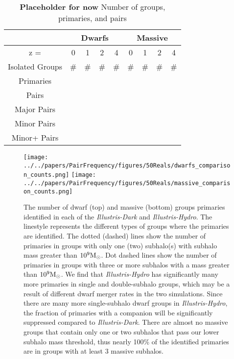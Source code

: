 \documentclass[twocolumn]{aastex63}
\newcommand{\kc}[1]{\textcolor{mypink}{\textbf{#1}} }
\begin{document}
\begin{table*}[htb]
  \begin{center}
\begin{tabular}{ccccc|cccc}
    & \multicolumn{4}{c}{Dwarfs} & \multicolumn{4}{c}{Massive} \\\hline\hline
    z = &0&1&2&4&0&1&2&4 \\ \hline
    Isolated Groups & \# & \# &\# &\#&\#&\#&\#&\#\\
Primaries &  & &&&&&& \\
Pairs &  & &&&&&& \\
Major Pairs &  & &&&&&& \\
Minor Pairs &  & &&&&&& \\
Minor+ Pairs &  & &&&&&& \\\hline
\end{tabular}
\end{center}
\caption{\label{table:counts}\kc{Placeholder for now} Number of groups, primaries, and pairs}
\end{table*}


\begin{figure}[htb]
    \centering
    \texttt{[image: ../../papers/PairFrequency/figures/50Reals/dwarfs\_comparison\_counts.png]}
    \texttt{[image: ../../papers/PairFrequency/figures/50Reals/massive\_comparison\_counts.png]}
    \caption{\label{fig:counts} The number of dwarf (top) and massive (bottom) groups primaries identified in each of the \textit{Illustris-Dark} and \textit{Illustris-Hydro}. The linestyle represents the different types of groups where the primaries are identified. The dotted (dashed) lines show the number of primaries in
    groups with only one (two) subhalo(s) with subhalo mass greater than $10^9 \rm M_\odot$. Dot dashed lines show the number of primaries in 
    groups with three or more subhalos with a mass greater than $10^9 \rm M_\odot$. We find that \textit{Illustris-Hydro} has significantly many more primaries in single and double-subhalo groups, which may be a result of different dwarf merger rates in the two simulations. Since there are many more single-subhalo dwarf groups in \textit{Illustris-Hydro}, the fraction of primaries with a companion will be significantly suppressed compared to \textit{Illustris-Dark}.
    There are almost no massive groups that contain only one or two subhalos that pass our lower subhalo mass threshold, thus nearly 100\% of the identified primaries are in groups with at least 3 massive subhalos.}
  \end{figure}
\end{document}
